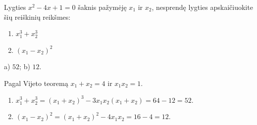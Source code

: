 \begin{salyga}
Lygties $x^2 - 4x + 1 = 0$ šaknis pažymėję $x_1$ ir $x_2$, nesprendę lygties apskaičiuokite šių reiškinių reikšmes:
    \begin{enumerate}[label=\alph*), itemsep=4pt]
        \item $x_1^3 + x_2^3$
        \item $(x_1 - x_2)^2$
    \end{enumerate}
\end{salyga}

\begin{atsakymas}
a) $52$; b) $12$.
\end{atsakymas}

\begin{sprendimas}
Pagal Vijeto teoremą $x_1+x_2=4$ ir $x_1x_2=1$.
\begin{enumerate}[label=\alph*)]
\item $x_1^3+x_2^3=(x_1+x_2)^3-3x_1x_2(x_1+x_2)=64-12=52$.
\item $(x_1-x_2)^2=(x_1+x_2)^2-4x_1x_2=16-4=12$.
\end{enumerate}
\end{sprendimas}
